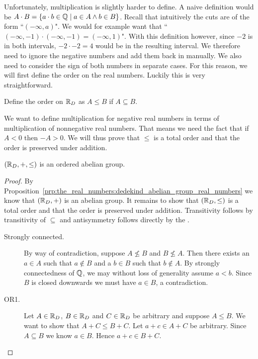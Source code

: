 \documentclass[../main.tex]{subfiles}
\begin{document}
Unfortunately, multiplication is slightly harder to define. A naive definition would be $A\cdot B=\{a\cdot b\in\mathbb{Q}\mid a\in A\land b\in B\}$. Recall that intuitively the cuts are of the form ``$(-\infty,a)$". We would for example want that ``$(-\infty,-1)\cdot(-\infty,-1)=(-\infty,1)$". With this definition however, since $-2$ is in both intervals, $-2\cdot-2=4$ would be in the resulting interval. We therefore need to ignore the negative numbers and add them back in manually. We also need to consider the sign of both numbers in separate cases. For this reason, we will first define the order on the real numbers. Luckily this is very straightforward.
\begin{definition}
    Define the order on $\mathbb{R}_D$ as $A\leq B$ if $A\subseteq B$.
\end{definition}
We want to define multiplication for negative real numbers in terms of multiplication of nonnegative real numbers. That means we need the fact that if $A<0$ then $-A>0$. We will thus prove that $\leq$ is a total order and that the order is preserved under addition.
\begin{proposition}\label{prp:the_real_numbers:dedekind_totally_ordered_abelian_group_real_numbers}
    $(\mathbb{R}_D,+,\leq)$ is an ordered abelian group.
\end{proposition}
\begin{proof}
    By Proposition~\ref{prp:the_real_numbers:dedekind_abelian_group_real_numbers} we know that $(\mathbb{R}_D,+)$ is an abelian group. It remains to show that $(\mathbb{R}_D,\leq)$ is a total order and that the order is preserved under addition. Transitivity follows by transitivity of $\subseteq$ and antisymmetry follows directly by the .
    \begin{description}
        \item[Strongly connected.] By way of contradiction, suppose $A\not\leq B$ and $B\not\leq A$. Then there exists an $a\in A$ such that $a\notin B$ and a $b\in B$ such that $b\notin A$. By strongly connectedness of $\mathbb{Q}$, we may without loss of generality assume $a<b$. Since $B$ is closed downwards we must have $a\in B$, a contradiction.
        \item[OR1.] Let $A\in\mathbb{R}_D$, $B\in\mathbb{R}_D$ and $C\in\mathbb{R}_D$ be arbitrary and suppose $A\leq B$. We want to show that $A+C\leq B+C$. Let $a+c\in A+C$ be arbitrary. Since $A\subseteq B$ we know $a\in B$. Hence $a+c\in B+C$.
    \end{description}
\end{proof}
\end{document}
